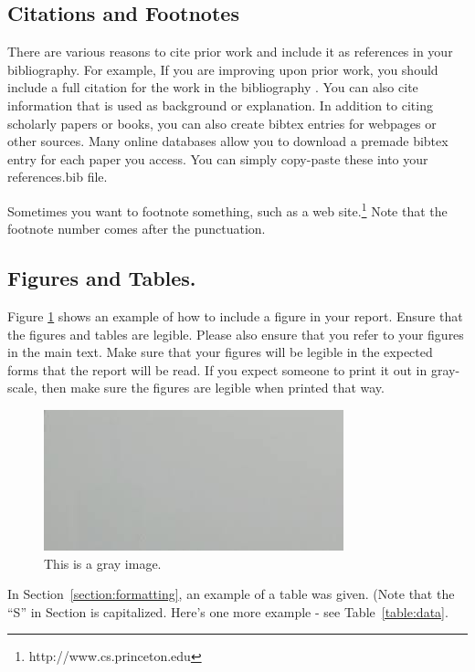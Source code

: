 \documentclass[pageno]{jpaper}
\begin{document}
\subsection{Citations and Footnotes}

There are various reasons to cite prior work and include it as references in your bibliography.  For example, If you are improving upon 
prior work, you should include
a full citation for the work in the bibliography \cite{nicepaper,nicepaper2}. 
You can also cite information that is used as background or
explanation\cite{Salzberg:2005}.  In addition to citing scholarly papers or books, you can
also create bibtex entries for webpages or other sources.  Many online
databases allow you to download a premade bibtex entry for each paper
you access.  You can simply copy-paste these into your references.bib
file.

Sometimes you want to footnote something, such as a web
site.\footnote{http://www.cs.princeton.edu}  Note that the footnote
number comes after the punctuation.

\subsection{Figures and Tables.}

Figure \ref{fig:gray} shows an example of how to include a figure in
your report.  
Ensure that the figures and
tables are legible.  Please also ensure that you refer to your
figures in the main text. Make sure that your figures will be legible
in the expected forms that the report will be read.  If you expect someone
to print it out in gray-scale, then make sure the figures are legible 
when printed that way.  

\begin{figure}[hbt]
	\centering
	\includegraphics[width=0.75\linewidth]{gray.jpg}
	\caption{This is a gray image.}
	\label{fig:gray}
\end{figure}

In Section~\ref{section:formatting}, an example of a table was given.
(Note that the ``S'' in Section is capitalized.  Here's one more
example - see Table~\ref{table:data}.
\end{document}
